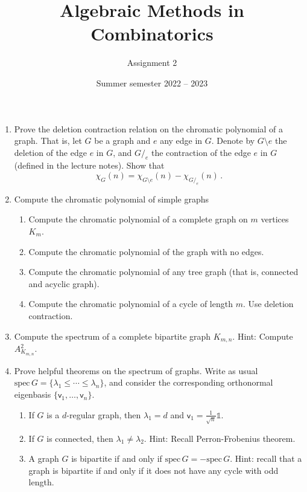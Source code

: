 \documentclass[kulak]{tplt}
\title{Algebraic Methods in Combinatorics}
\author{Assignment 2}
\date{Summer semester 2022 -- 2023}
\theoremstyle{definition}
\newcommand{\vv}{\mathsf{v}}
\newcommand{\spec}{\mathrm{spec}}
\begin{document}
\maketitle
\begin{enumerate}
\item Prove the deletion contraction relation on the chromatic polynomial of a graph.
That is, let $G$ be a graph and $e$ any edge in $G$.
Denote by $G\setminus e $ the deletion of the edge $e$ in $G$, and $G /_e$ the contraction of the edge $e$ in $G$ (defined in the lecture notes).
Show that
$$ \chi_G(n) = \chi_{G\setminus e}(n) - \chi_{G /_e}(n)\, . $$

\item Compute the chromatic polynomial of simple graphs

\begin{enumerate}
\item Compute the chromatic polynomial of a complete graph on $m$ vertices $K_m$.

\item Compute the chromatic polynomial of the graph with no edges.

\item Compute the chromatic polynomial of any tree graph (that is, connected and acyclic graph).

\item Compute the chromatic polynomial of a cycle of length $m$.
Use deletion contraction.
\end{enumerate}



\item Compute the spectrum of a complete bipartite graph $K_{m, n}$.
Hint: Compute $A_{K_{m, n}}^2$.



\item Prove helpful theorems on the spectrum of graphs.
Write as usual $\spec \, G = \{\lambda_1 \leq \cdots \leq \lambda_n \}$, and consider the corresponding orthonormal eigenbasis $\{\vv_1, \ldots, \vv_n\}$.


\begin{enumerate}
\item If $G$ is a $d$-regular graph, then $\lambda_1 = d$ and $\vv_1 = \frac{1}{\sqrt{n}}\mathbb{1}$.

\item If $G$ is connected, then $\lambda_1 \neq \lambda_2$. Hint: Recall Perron-Frobenius theorem.

\item A graph $G$ is bipartite if and only if $\spec \, G = - \spec \, G$.
Hint: recall that a graph is bipartite if and only if it does not have any cycle with odd length.


\end{enumerate}
\end{enumerate}
\end{document}
